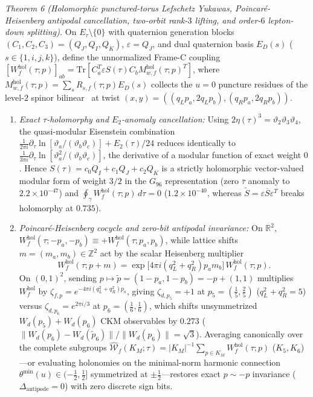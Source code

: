 \documentclass[aps,prd,twocolumn,nofootinbib,floatfix]{revtex4-2}
\begin{document}
\emph{Theorem 6 (Holomorphic punctured-torus Lefschetz Yukawas, Poincar\'e-Heisenberg antipodal cancellation, two-orbit rank-$3$ lifting, and order-$6$ lepton-down splitting).}
On $E_\tau\setminus\{0\}$ with quaternion generation blocks $(C_1, C_2, C_3) = (Q_J, Q_I, Q_K)$, $\varepsilon = Q_J$, and dual quaternion basis $E_D(s)$ ($s \in \{1,i,j,k\}$), define the unnormalized Frame-C coupling $[W_f^{\mathrm{hol}}(\tau;p)]_{ab} = \mathrm{Tr}[C_a^T \varepsilon S(\tau) C_b M_{w,f}^{\mathrm{hol}}(\tau;p)^T]$, where $M_{w,f}^{\mathrm{hol}}(\tau;p) = \sum_s R_{s,f}(\tau;p) E_D(s)$ collects the $u=0$ puncture residues of the level-$2$ spinor bilinear~\cite{Mumford1983} at twist $(x, y) = ((q_L p_a, 2q_L p_b), (q_R p_a, 2q_R p_b))$.
\begin{enumerate}
    \item \emph{Exact $\tau$-holomorphy and $E_2$-anomaly cancellation:} Using $2\eta(\tau)^3 = \vartheta_2\vartheta_3\vartheta_4$, the quasi-modular Eisenstein combination $\frac{1}{2\pi i}\partial_\tau\ln[\vartheta_a/(\vartheta_b\vartheta_c)] + E_2(\tau)/24$ reduces identically to $\frac{1}{3\pi i}\partial_\tau\ln[\vartheta_a^2/(\vartheta_b\vartheta_c)]$, the derivative of a modular function of exact weight $0$. Hence $S(\tau) = c_0 Q_I + c_1 Q_J + c_2 Q_K$ is a strictly holomorphic vector-valued modular form of weight $3/2$ in the $G_{96}$ representation (zero $\bar{\tau}$ anomaly to $2.2\times 10^{-47}$) and $\oint_\gamma W_f^{\mathrm{hol}}(\tau;p)\,d\tau = 0$ ($1.2\times 10^{-40}$, whereas $\tilde{S} = \varepsilon\overline{S}\varepsilon^T$ breaks holomorphy at $0.735$).
    \item \emph{Poincar\'e-Heisenberg cocycle and zero-bit antipodal invariance:} On $\mathbb{R}^2$, $W_f^{\mathrm{hol}}(\tau; -p_a, -p_b) \equiv +W_f^{\mathrm{hol}}(\tau; p_a, p_b)$, while lattice shifts $m = (m_a, m_b) \in \mathbb{Z}^2$ act by the scalar Heisenberg multiplier
    \begin{equation}
    \label{eq:heisenberg_cocycle}
    W_f^{\mathrm{hol}}(\tau; p + m) = \exp\bigl[4\pi i(q_L^2 + q_R^2)p_a m_b\bigr]\,W_f^{\mathrm{hol}}(\tau; p).
    \end{equation}
    On $(0,1)^2$, sending $p \mapsto \tilde{p} = (1-p_a, 1-p_b) = -p + (1,1)$ multiplies $W_f^{\mathrm{hol}}$ by $\zeta_{f,p} = e^{-4\pi i(q_L^2+q_R^2)p_a}$, giving $\zeta_{d,p_5} = +1$ at $p_5 = (\frac{1}{5},\frac{2}{5})$ ($q_L^2+q_R^2 = 5$) versus $\zeta_{d,p_6} = e^{2\pi i/3}$ at $p_6 = (\frac{1}{6},\frac{1}{6})$, which shifts unsymmetrized $W_d(p_5)+W_d(p_6)$ CKM observables by $0.273$ ($\|W_d(p_6)-W_d(\tilde{p}_6)\|/\|W_d(p_6)\| = \sqrt{3}$). Averaging canonically over the complete subgroups $\widehat{\mathcal{W}}_f(K_M;\tau) = |K_M|^{-1}\sum_{p\in K_M} W_f^{\mathrm{hol}}(\tau;p)$ ($K_5, K_6$)---or evaluating holonomies on the minimal-norm harmonic connection $\theta^{\mathrm{min}}(u) \in (-\frac{1}{2},\frac{1}{2}]$ symmetrized at $\pm\frac{1}{2}$---restores exact $p \sim -p$ invariance ($\Delta_{\mathrm{antipode}} = 0$) with zero discrete sign bits.

\end{enumerate}
\end{document}
